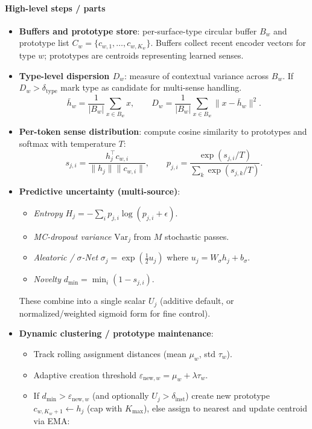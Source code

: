 \documentclass[11pt]{article}
\begin{document}
\paragraph{High-level steps / parts}
\begin{itemize}
  \item \textbf{Buffers and prototype store}: per-surface-type circular buffer $B_w$ and prototype list $C_w=\{c_{w,1},\dots,c_{w,K_w}\}$. Buffers collect recent encoder vectors for type $w$; prototypes are centroids representing learned senses.
  \item \textbf{Type-level dispersion $D_w$}: measure of contextual variance across $B_w$. If $D_w > \delta_{\text{type}}$ mark type as candidate for multi-sense handling.
    \[
    \bar h_w = \frac{1}{|B_w|}\sum_{x\in B_w} x,\qquad
    D_w = \frac{1}{|B_w|}\sum_{x\in B_w} \|x - \bar h_w\|^2.
    \]
  \item \textbf{Per-token sense distribution}: compute cosine similarity to prototypes and softmax with temperature $T$:
    \[
    s_{j,i}=\frac{h_j^\top c_{w,i}}{\|h_j\|\|c_{w,i}\|},\qquad
    p_{j,i}=\frac{\exp(s_{j,i}/T)}{\sum_k\exp(s_{j,k}/T)}.
    \]
  \item \textbf{Predictive uncertainty (multi-source)}:
    \begin{itemize}
      \item \emph{Entropy} $H_j=-\sum_i p_{j,i}\log(p_{j,i}+\epsilon)$.
      \item \emph{MC-dropout variance} $\mathrm{Var}_j$ from $M$ stochastic passes.
      \item \emph{Aleatoric / $\sigma$-Net} $\sigma_j=\exp(\tfrac12 u_j)$ where $u_j=W_\sigma h_j+b_\sigma$.
      \item \emph{Novelty} $d_{\min}=\min_i (1-s_{j,i})$.
    \end{itemize}
    These combine into a single scalar $U_j$ (additive default, or normalized/weighted sigmoid form for fine control).
  \item \textbf{Dynamic clustering / prototype maintenance}:
    \begin{itemize}
      \item Track rolling assignment distances (mean $\mu_w$, std $\tau_w$).
      \item Adaptive creation threshold $\varepsilon_{\text{new},w}=\mu_w+\lambda \tau_w$.
      \item If $d_{\min}>\varepsilon_{\text{new},w}$ (and optionally $U_j>\delta_{\text{inst}}$) create new prototype $c_{w,K_w+1}\leftarrow h_j$ (cap with $K_{\max}$), else assign to nearest and update centroid via EMA:

\end{itemize}
\end{itemize}
\end{document}
